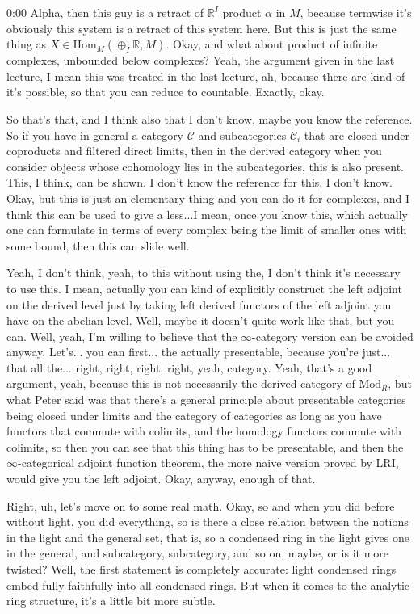 \begin{unfinished}{0:00}
Alpha, then this guy is a retract of $\mathbb{R}^I$ product $\alpha$ in $M$, because termwise it's obviously this system is a retract of this system here. But this is just the same thing as $X \in \text{Hom}_M(\oplus_I \mathbb{R}, M)$. Okay, and what about product of infinite complexes, unbounded below complexes? Yeah, the argument given in the last lecture, I mean this was treated in the last lecture, ah, because there are kind of it's possible, so that you can reduce to countable. Exactly, okay. 

So that's that, and I think also that I don't know, maybe you know the reference. So if you have in general a category $\mathcal{C}$ and subcategories $\mathcal{C}_i$ that are closed under coproducts and filtered direct limits, then in the derived category when you consider objects whose cohomology lies in the subcategories, this is also present. This, I think, can be shown. I don't know the reference for this, I don't know. Okay, but this is just an elementary thing and you can do it for complexes, and I think this can be used to give a less...I mean, once you know this, which actually one can formulate in terms of every complex being the limit of smaller ones with some bound, then this can slide well.

Yeah, I don't think, yeah, to this without using the, I don't think it's necessary to use this. I mean, actually you can kind of explicitly construct the left adjoint on the derived level just by taking left derived functors of the left adjoint you have on the abelian level. Well, maybe it doesn't quite work like that, but you can. Well, yeah, I'm willing to believe that the $\infty$-category version can be avoided anyway. Let's... you can first... the actually presentable, because you're just... that all the... right, right, right, right, yeah, category. Yeah, that's a good argument, yeah, because this is not necessarily the derived category of $\text{Mod}_R$, but what Peter said was that there's a general principle about presentable categories being closed under limits and the category of categories as long as you have functors that commute with colimits, and the homology functors commute with colimits, so then you can see that this thing has to be presentable, and then the $\infty$-categorical adjoint function theorem, the more naive version proved by LRI, would give you the left adjoint. Okay, anyway, enough of that. 

Right, uh, let's move on to some real math. Okay, so and when you did before without light, you did everything, so is there a close relation between the notions in the light and the general set, that is, so a condensed ring in the light gives one in the general, and subcategory, subcategory, and so on, maybe, or is it more twisted? Well, the first statement is completely accurate: light condensed rings embed fully faithfully into all condensed rings. But when it comes to the analytic ring structure, it's a little bit more subtle.


\end{unfinished}
